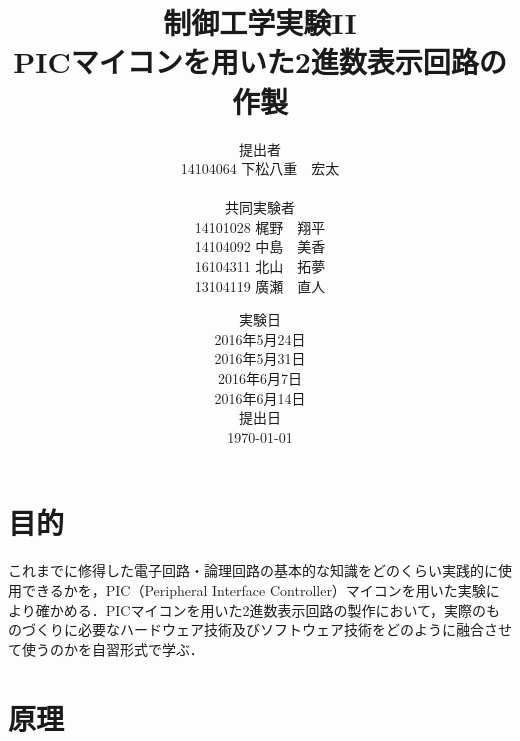 \documentclass[11pt,a4paper]{jsarticle}
\begin{document}
\title{制御工学実験II \\ PICマイコンを用いた2進数表示回路の作製}
\author{提出者 \\ 14104064 下松八重　宏太 \\ \\ 共同実験者 \\ 14101028 梶野　翔平 \\ 14104092 中島　美香 \\ 16104311 北山　拓夢 \\ 13104119 廣瀬　直人}
\date{実験日  \\ 2016年5月24日 \\ 2016年5月31日 \\ 2016年6月7日 \\ 2016年6月14日 \\  提出日 \\ \today}



\maketitle
\thispagestyle{empty}
\newpage


\section{目的}
これまでに修得した電子回路・論理回路の基本的な知識をどのくらい実践的に使用できるかを，PIC（Peripheral Interface Controller）マイコンを用いた実験により確かめる．PICマイコンを用いた2進数表示回路の製作において，実際のものづくりに必要なハードウェア技術及びソフトウェア技術をどのように融合させて使うのかを自習形式で学ぶ．

\section{原理}
\end{document}
